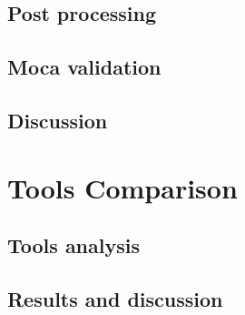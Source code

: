 \subsection{Post processing}

\subsection{Moca validation}

\subsection{Discussion}

\section{Tools Comparison}

\subsection{Tools analysis}

\subsection{Results and discussion}


